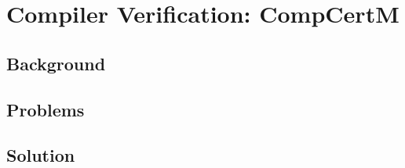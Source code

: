 \chapter{\;\;\;\;Compiler Verification: CompCertM}
\label{sec:compiler}

\section{Background}
\label{sec:compiler:background}

\section{Problems}
\label{sec:compiler:problems}

\section{Solution}
\label{sec:compiler:solution}
